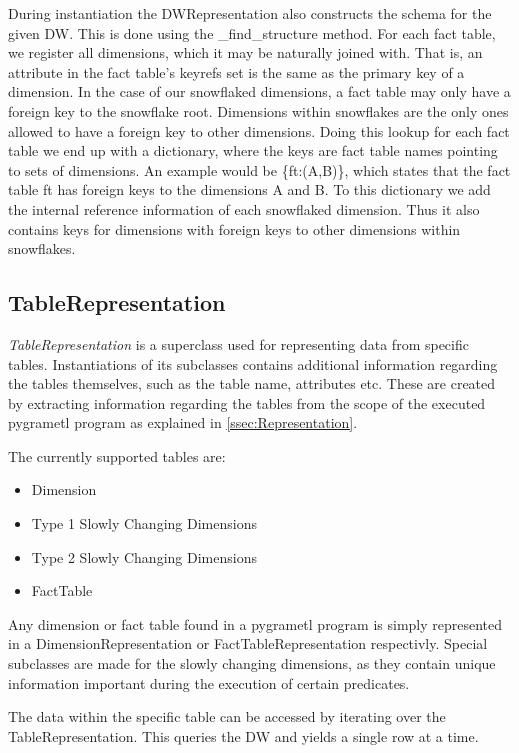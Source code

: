 During instantiation the DWRepresentation also constructs the schema for the given DW. This is done using the \_find\_structure method. For each fact table, we register all dimensions, which it may be naturally joined with. That is, an attribute in the fact table’s keyrefs set is the same as the primary key of a dimension. In the case of our snowflaked dimensions, a fact table may only have a foreign key to the snowflake root. Dimensions within snowflakes are the only ones allowed to have a foreign key to other dimensions. Doing this lookup for each fact table we end up with a dictionary, where the keys are fact table names pointing to sets of dimensions. An example would be \{ft:(A,B)\}, which states that the fact table ft has foreign keys to the dimensions A and B. To this dictionary we add the internal reference information of each snowflaked dimension. Thus it also contains keys for dimensions with foreign keys to other dimensions within snowflakes.

\subsection{TableRepresentation}
\textit{TableRepresentation} is a superclass used for representing data from specific tables. Instantiations of its subclasses contains additional information regarding the tables themselves, such as the table name, attributes etc. These are created by extracting information regarding the tables from the scope of the executed pygrametl program as explained in \cref{ssec:Representation}.

The currently supported tables are:

\begin{itemize}
\item Dimension
\item Type 1 Slowly Changing Dimensions
\item Type 2 Slowly Changing Dimensions
\item FactTable
\end{itemize}

Any dimension or fact table found in a pygrametl program is simply represented in a DimensionRepresentation or FactTableRepresentation respectivly. Special subclasses are made for the slowly changing dimensions, as they contain unique information important during the execution of certain predicates.

The data within the specific table can be accessed by iterating over the TableRepresentation. This queries the DW and yields a single row at a time.


